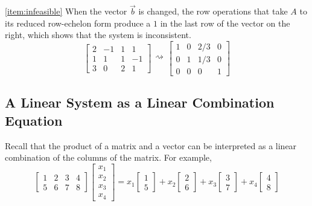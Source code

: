 \documentclass{ximera}
\begin{document}
\begin{example}
\begin{explanation}
 \ref{item:infeasible} When the vector $\vec{b}$ is changed, the row operations that take $A$ to its reduced row-echelon form produce a $1$ in the last row of the vector on the right, which shows that the system is inconsistent.
 $$\left[\begin{array}{ccc|c}  
 2&-1&1&1\\1&1&1&-1\\3&0&2&1
 \end{array}\right]\begin{array}{c}
 \\
 \rightsquigarrow\\
 \\
 \end{array}\left[\begin{array}{ccc|c}  
 1&0&2/3&0\\0&1&1/3&0\\0&0&0&1
 \end{array}\right]$$
\end{explanation}
\end{example}

\subsection*{A Linear System as a Linear Combination Equation}

Recall that the product of a matrix and a vector can be interpreted as a linear combination of the columns of the matrix.  For example,
$$\begin{bmatrix}1&2&3&4\\5&6&7&8\end{bmatrix}\begin{bmatrix}x_1\\x_2\\x_3\\x_4\end{bmatrix}=x_1\begin{bmatrix}1\\5\end{bmatrix}+x_2\begin{bmatrix}2\\6\end{bmatrix}+x_3\begin{bmatrix}3\\7\end{bmatrix}+x_4\begin{bmatrix}4\\8\end{bmatrix}$$
\end{document}
